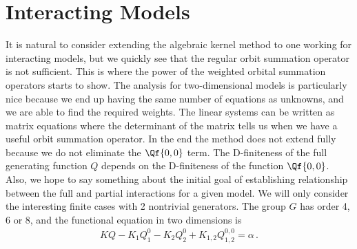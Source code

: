 \section{Interacting Models}
It is natural to consider extending the algebraic kernel method to one working for interacting models, but we quickly see that the regular orbit summation operator is not sufficient. This is where the power of the weighted orbital summation operators starts to show. The analysis for two-dimensional models is particularly nice because we end up having the same number of equations as unknowns, and we are able to find the required weights. The linear systems can be written as matrix equations where the determinant of the matrix tells us when we have a useful orbit summation operator. In the end the method does not extend fully because we do not eliminate the $\Qf{0,0}$ term. The D-finiteness of the full generating function $Q$ depends on the D-finiteness of the function $\Qf{0,0}$. Also, we hope to say something about the initial goal of establishing relationship between the full and partial interactions for a given model. We will only consider the interesting finite cases with 2 nontrivial generators. The group $G$ has order 4, 6 or 8, and the functional equation in two dimensions is
\begin{align}
	KQ  - K_1 Q_1^0 -  K_2 Q_2^0 + K_{1,2}Q_{1,2}^{0,0} = \alpha\,.
\end{align}
